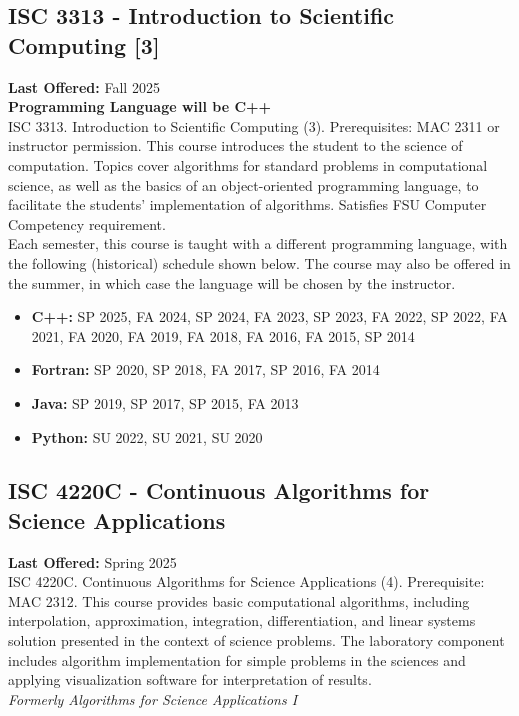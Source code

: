 \documentclass[12pt,a4paper]{article}
\begin{document}
\subsection{ISC 3313 - Introduction to Scientific Computing [3]}
\textbf{Last Offered:} Fall 2025 \\
\textbf{Programming Language will be C++} \\
ISC 3313. Introduction to Scientific Computing (3). Prerequisites: MAC 2311 or instructor permission. This course introduces the student to the science of computation. Topics cover algorithms for standard problems in computational science, as well as the basics of an object-oriented programming language, to facilitate the students' implementation of algorithms. Satisfies FSU Computer Competency requirement. \\
Each semester, this course is taught with a different programming language, with the following (historical) schedule shown below. The course may also be offered in the summer, in which case the language will be chosen by the instructor.
\begin{itemize}
    \item \textbf{C++:} SP 2025, FA 2024, SP 2024, FA 2023, SP 2023, FA 2022, SP 2022, FA 2021, FA 2020, FA 2019, FA 2018, FA 2016, FA 2015, SP 2014
    \item \textbf{Fortran:} SP 2020, SP 2018, FA 2017, SP 2016, FA 2014
    \item \textbf{Java:} SP 2019, SP 2017, SP 2015, FA 2013
    \item \textbf{Python:} SU 2022, SU 2021, SU 2020
\end{itemize}

\subsection{ISC 4220C - Continuous Algorithms for Science Applications}
\textbf{Last Offered:} Spring 2025 \\
ISC 4220C. Continuous Algorithms for Science Applications (4). Prerequisite: MAC 2312. This course provides basic computational algorithms, including interpolation, approximation, integration, differentiation, and linear systems solution presented in the context of science problems. The laboratory component includes algorithm implementation for simple problems in the sciences and applying visualization software for interpretation of results. \\
\textit{Formerly Algorithms for Science Applications I}
\end{document}
